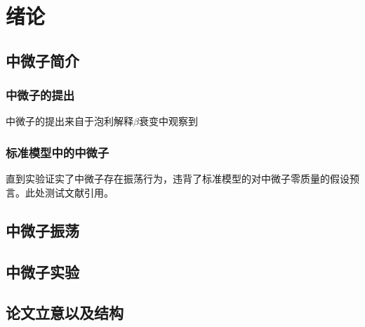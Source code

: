 
\chapter{绪论}
\label{chap:introduction}
\section{中微子简介}
\subsection{中微子的提出}
中微子的提出来自于泡利解释$\beta$衰变中观察到
\subsection{标准模型中的中微子}
直到实验证实了中微子存在振荡行为，违背了标准模型的对中微子零质量的假设预言。此处测试文献引用\cite{Fogli:2007tx,Machado:2011tn}。
\section{中微子振荡}
\section{中微子实验}
\section{论文立意以及结构}
